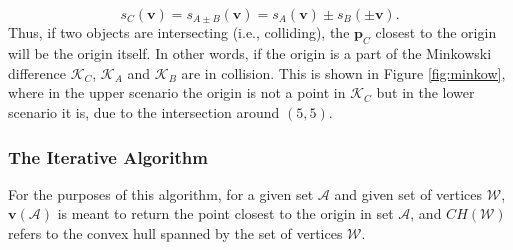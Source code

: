 \begin{equation}
s_C(\textbf{v}) = s_{A\pm  B}(\textbf{v}) = s_A(\textbf{v})\pm s_B(\pm\textbf{v}).
\end{equation}
Thus, if two objects are intersecting (i.e., colliding), the $\textbf{p}_C$ closest to the origin will be the origin itself. In other words, if the origin is a part of the Minkowski difference $\mathcal{K}_C$, $\mathcal{K}_A$ and $\mathcal{K}_B$ are in collision. This is shown in Figure \ref{fig:minkow}, where in the upper scenario the origin is not a point in $\mathcal{K}_C$ but in the lower scenario it is, due to the intersection around $(5,5)$.

\subsubsection{The Iterative Algorithm} \label{subsubsec:GJKiter}

For the purposes of this algorithm, for a given set $\mathcal{A}$ and given set of vertices $\mathcal{W}$, $\textbf{v}(\mathcal{A})$ is meant to return the point closest to the origin in set $\mathcal{A}$, and $CH(\mathcal{W})$ refers to the convex hull spanned by the set of vertices $\mathcal{W}$. 

